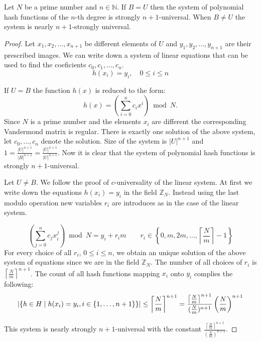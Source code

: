 \begin{remark}
Let $N$ be a prime number and $n \in \mathbb{N}$. If $B = U$ then the system of polynomial hash functions of the $n$-th degree is strongly $n + 1$-universal. When $B \neq U$ the system is nearly $n + 1$-strongly universal.
\end{remark}
\begin{proof}
Let $x_1, x_2, \dots, x_{n+1}$ be different elements of $U$ and $y_1, y_2, \dots, y_{n+1}$ are their prescribed images. We can write down a system of linear equations that can be used to find the coeficients $c_0, c_1, \dots, c_n$.
\[ 
h(x_i) = y_i, \quad 0 \leq i \leq n 
\]

If $U = B$ the function $h(x)$ is reduced to the form: \[ h(x) = \left( \displaystyle \sum_{i=0}^{n} c_i x^i \right) \bmod N \textit{.} \] Since $N$ is a prime number and the elements $x_i$ are different the corresponding Vandermond matrix is regular. There is exactly one solution of the above system, let $c_0, \dots, c_n$ denote the solution. Size of the system is ${|U|}^{n+1}$ and $1 = \frac{|U| ^ {n + 1}}{|B|^{n + 1}} = \frac{|U| ^ {n + 1}}{|U|^{n + 1}}$. Now it is clear that the system of polynomial hash functions is strongly $n + 1$-universal.

Let $U \neq B$. We follow the proof of $c$-universality of the linear system. At first we write down the equations $h(x_i) = y_i$ in the field $\mathbb{Z}_N$. Instead using the last modulo operation new variables $r_i$ are introduces as in the case of the linear system.

\begin{displaymath}
\left(\displaystyle \sum_{j=0}^{n} c_j x_{i}^{j} \right) \bmod N = {y}_i + {r_i}{m} \qquad r_i \in \left\{0, m, 2m, \dots, \left\lceil \frac{N}{m} \right\rceil - 1 \right\}
\end{displaymath}
For every choice of all $r_i$, $0 \leq i \leq n$, we obtain an unique solution of the above system of equations since we are in the field $\mathbb{Z}_N$. The number of all choices of $r_i$ is ${\left\lceil \frac{N}{m} \right\rceil}^{n + 1}$. The count of all hash functions mapping $x_i$ onto $y_i$ complies the following:
\begin{displaymath}
|\{h \in H \mid h(x_i) = y_i, i \in \{1, \dots, n + 1\}\}| \leq {\left\lceil \frac{N}{m} \right\rceil}^{n + 1} = \frac{{\left\lceil \frac{N}{m} \right\rceil}^{n + 1}}{(\frac{N}{m})^{n+1}}\left(\frac{N}{m}\right)^{n+1}
\end{displaymath}

This system is nearly strongly $n+1$-universal with the constant $\frac{{\left\lceil \frac{N}{m} \right\rceil}^{n + 1}}{(\frac{N}{m})^{n+1}}$.
\end{proof}

